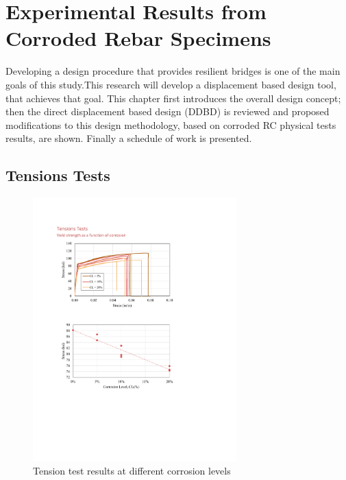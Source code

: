 \chapter{Experimental Results from Corroded Rebar Specimens}
Developing a design procedure that provides resilient bridges is one of the main goals of this study.This research will develop a displacement based design tool, that achieves that goal. This chapter first introduces the overall design concept; then the direct displacement based design (DDBD) is reviewed and proposed modifications to this design methodology, based on corroded RC physical tests results, are shown. Finally a schedule of work is presented.

\section{Tensions Tests}
\begin{figure}[htbp]
	\centering
	\includegraphics[width=0.7\textwidth]{VAC Thesis 2.0/Chapter-4/figs/TensionTest_results_1.pdf}
	\caption{Tension test results at different corrosion levels}
	\label{fig:TensionTestResults_StressStrain}
\end{figure}

